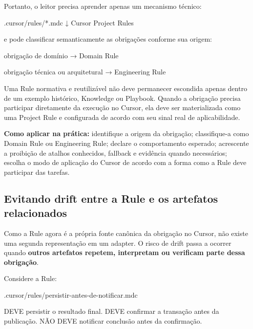 \documentclass[
  10pt,
  a4paper,
  oneside]{book}
\newenvironment{Shaded}{}{}
\newcommand{\NormalTok}[1]{#1}
\renewenvironment{Shaded}{\begin{snugshade}}{\end{snugshade}}%
\begin{document}
Portanto, o leitor precisa aprender apenas um mecanismo técnico:

\begin{Shaded}
\begin{Highlighting}[]
\NormalTok{.cursor/rules/*.mdc}
\NormalTok{        ↓}
\NormalTok{Cursor Project Rules}
\end{Highlighting}
\end{Shaded}

e pode classificar semanticamente as obrigações conforme sua origem:

\begin{Shaded}
\begin{Highlighting}[]
\NormalTok{obrigação de domínio}
\NormalTok{→ Domain Rule}

\NormalTok{obrigação técnica ou arquitetural}
\NormalTok{→ Engineering Rule}
\end{Highlighting}
\end{Shaded}

Uma Rule normativa e reutilizável não deve permanecer escondida apenas
dentro de um exemplo histórico, Knowledge ou Playbook. Quando a
obrigação precisa participar diretamente da execução no Cursor, ela deve
ser materializada como uma Project Rule e configurada de acordo com seu
sinal real de aplicabilidade.

\textbf{Como aplicar na prática:} identifique a origem da obrigação;
classifique-a como Domain Rule ou Engineering Rule; declare o
comportamento esperado; acrescente a proibição de atalhos conhecidos,
fallback e evidência quando necessários; escolha o modo de aplicação do
Cursor de acordo com a forma como a Rule deve participar das tarefas.

\hypertarget{evitando-drift-entre-a-rule-e-os-artefatos-relacionados}{%
\subsection{Evitando drift entre a Rule e os artefatos
relacionados}\label{evitando-drift-entre-a-rule-e-os-artefatos-relacionados}}

Como a Rule agora é a própria fonte canônica da obrigação no Cursor, não
existe uma segunda representação em um adapter. O risco de drift passa a
ocorrer quando \textbf{outros artefatos repetem, interpretam ou
verificam parte dessa obrigação}.

Considere a Rule:

\begin{Shaded}
\begin{Highlighting}[]
\NormalTok{.cursor/rules/persistir{-}antes{-}de{-}notificar.mdc}

\NormalTok{DEVE persistir o resultado final.}
\NormalTok{DEVE confirmar a transação antes da publicação.}
\NormalTok{NÃO DEVE notificar conclusão antes da confirmação.}
\end{Highlighting}
\end{Shaded}
\end{document}
